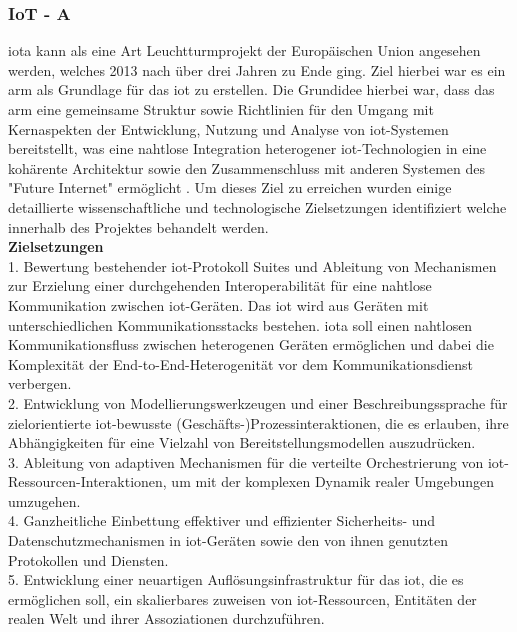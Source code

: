 \documentclass[a4paper, 12pt, twoside, headsepline=true]{scrartcl} %
\begin{document}
\subsubsection{IoT - A}
\acl{iota} kann als eine Art Leuchtturmprojekt der Europäischen Union angesehen werden, welches 2013 nach über drei Jahren zu Ende ging. Ziel hierbei war es ein \ac{arm} als Grundlage für das \ac{iot} zu erstellen. Die Grundidee hierbei war, dass das \ac{arm} eine gemeinsame Struktur sowie Richtlinien für den Umgang mit Kernaspekten der Entwicklung, Nutzung und Analyse von \ac{iot}-Systemen bereitstellt, was eine nahtlose Integration heterogener \ac{iot}-Technologien in eine kohärente Architektur sowie den Zusammenschluss mit anderen Systemen des "Future Internet" ermöglicht \cite[S.17]{enablingthingstotalk}. Um dieses Ziel zu erreichen wurden einige detaillierte wissenschaftliche und technologische Zielsetzungen identifiziert welche innerhalb des Projektes behandelt werden\cite{meetiot}.\\


\textbf{Zielsetzungen}\\

1. Bewertung bestehender \ac{iot}-Protokoll Suites und Ableitung von Mechanismen zur Erzielung einer durchgehenden Interoperabilität für eine nahtlose Kommunikation zwischen \ac{iot}-Geräten. Das \ac{iot} wird aus Geräten mit unterschiedlichen Kommunikationsstacks bestehen. \ac{iota} soll einen nahtlosen Kommunikationsfluss zwischen heterogenen Geräten ermöglichen und dabei die Komplexität der End-to-End-Heterogenität vor dem Kommunikationsdienst verbergen.\\

2. Entwicklung von Modellierungswerkzeugen und einer Beschreibungssprache für zielorientierte \ac{iot}-bewusste (Geschäfts-)Prozessinteraktionen, die es erlauben, ihre Abhängigkeiten für eine Vielzahl von Bereitstellungsmodellen auszudrücken.\\

3. Ableitung von adaptiven Mechanismen für die verteilte Orchestrierung von \ac{iot}-Ressourcen-Interaktionen, um mit der komplexen Dynamik realer Umgebungen umzugehen. \\

4. Ganzheitliche Einbettung effektiver und effizienter Sicherheits- und Datenschutzmechanismen in \ac{iot}-Geräten sowie den von ihnen genutzten Protokollen und Diensten.\\

5. Entwicklung einer neuartigen Auflösungsinfrastruktur für das \ac{iot}, die es ermöglichen soll, ein skalierbares zuweisen von \ac{iot}-Ressourcen, Entitäten der realen Welt und ihrer Assoziationen durchzuführen.\\
\end{document}
